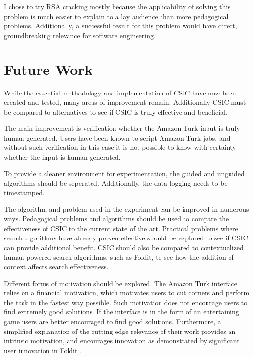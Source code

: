 I chose to try RSA cracking mostly because the applicability of solving this problem is much easier to explain to a lay audience than more pedagogical problems.  Additionally, a successful result for this problem would have direct, groundbreaking relevance for software engineering.

\section{Future Work}\label{sec:future-work}

While the essential methodology and implementation of CSIC have now been created and tested, many areas of improvement remain.  Additionally CSIC must be compared to alternatives to see if CSIC is truly effective and beneficial.

The main improvement is verification whether the Amazon Turk input is truly human generated.  Users have been known to script Amazon Turk jobs, and without such verification in this case it is not possible to know with certainty whether the input is human generated.

To provide a cleaner environment for experimentation, the guided and unguided algorithms should be seperated.  Additionally, the data logging needs to be timestamped.

The algorithm and problem used in the experiment can be improved in numerous ways.  Pedagogical problems and algorithms should be used to compare the effectiveness of CSIC to the current state of the art.  Practical problems where search algorithms have already proven effective should be explored to see if CSIC can provide additional benefit.  CSIC should also be compared to contextualized human powered search algorithms, such as Foldit, to see how the addition of context affects search effectiveness.  

Different forms of motivation should be explored.  The Amazon Turk interface relies on a financial motivation, which motivates users to cut corners and perform the task in the fastest way possible.  Such motivation does not encourage users to find extremely good solutions.  If the interface is in the form of an entertaining game users are better encouraged to find good solutions.  Furthermore, a simplified explanation of the cutting edge relevance of their work provides an intrinsic motivation, and encourages innovation as demonstrated by significant user innovation in Foldit \cite{moore12:_foldit_game_leads_to_aids_resear_break}.



